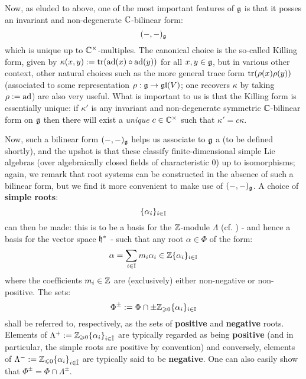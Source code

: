         Now, as eluded to above, one of the most important features of $\mathfrak{g}$ is that it posses an invariant and non-degenerate $\mathbb{C}$-bilinear form:
            $$(-, -)_{\mathfrak{g}}$$
        which is unique up to $\bbC^{\x}$-multiples. The canonical choice is the so-called Killing form, given by $\kappa(x, y) := \operatorname{tr}(\mathrm{ad}(x) \circ \mathrm{ad}(y))$ for all $x, y \in \mathfrak{g}$, but in various other context, other natural choices such as the more general trace form $\operatorname{tr}(\rho(x) \rho(y))$ (associated to some representation $\rho: \mathfrak{g} \to \mathfrak{gl}(V)$; one recovers $\kappa$ by taking $\rho := \mathrm{ad}$) are also very useful. What is important to us is that the Killing form is essentially unique: if $\kappa'$ is any invariant and non-degenerate symmetric $\mathbb{C}$-bilinear form on $\mathfrak{g}$ then there will exist a \textit{unique} $c \in \bbC^{\x}$ such that $\kappa' = c \kappa$.

        Now, such a bilinear form $(-, -)_{\mathfrak{g}}$ helps us associate to $\mathfrak{g}$ a  (to be defined shortly), and the upshot is that these  classify finite-dimensional simple Lie algebras (over algebraically closed fields of characteristic $0$) up to isomorphisms; again, we remark that root systems can be constructed in the absence of such a bilinear form, but we find it more convenient to make use of $(-, -)_{\mathfrak{g}}$. A choice of \textbf{simple roots}:
            $$\{\alpha_i\}_{i \in \mathbb{I}}$$
        can then be made: this is to be a basis for the $\mathbb{Z}$-module $\Lambda$ (cf. \cite[Subsection 10.1, p. 47]{humphreys_lie_algebras}) - and hence a basis for the vector space $\mathfrak{h}^*$ - such that any root $\alpha \in \Phi$ of the form:
            $$\alpha = \sum_{i \in \mathbb{I}} m_i \alpha_i \in \mathbb{Z}\{\alpha_i\}_{i \in \mathbb{I}}$$
        where the coefficients $m_i \in \mathbb{Z}$ are (exclusively) either non-negative or non-positive. The sets:
            $$\Phi^{\pm} := \Phi \cap \pm \mathbb{Z}_{\geqslant 0} \{\alpha_i\}_{i \in \mathbb{I}}$$
        shall be referred to, respectively, as the sets of \textbf{positive} and \textbf{negative} roots. Elements of $\Lambda^+ := \mathbb{Z}_{\geqslant 0} \{\alpha_i\}_{i \in \hat{\mathbb{I}}}$ are typically regarded as being \textbf{positive} (and in particular, the simple roots are positive by convention) and conversely, elements of $\Lambda^- := \mathbb{Z}_{\leqslant 0} \{\alpha_i\}_{i \in \hat{\mathbb{I}}}$ are typically said to be \textbf{negative}. One can also easily show that $\Phi^{\pm} = \Phi \cap \Lambda^{\pm}$. 

